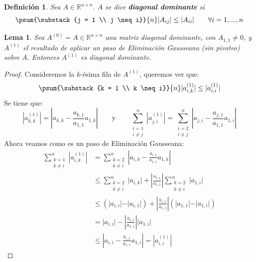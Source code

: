 \documentclass[12pt]{article}
\newtheorem{lema}{Lema}
\newtheorem{defi}{Definición}
\newcommand{\sub}[3]{\ensuremath{#1_{#2,#3}}}
\begin{document}
\begin{defi}
Sea \(A \in \mathbb{R}^{n \times n}\). \(A\) se dice \textbf{diagonal dominante} si 
\[
  \psum{\substack{j = 1 \\ j \neq i}}{n}|A_{ij}| \leq  |A_{ii}| \qquad \forall i = 1, ..., n
\]
\end{defi}

\begin{lema}
\label{lema:EG conserva diagonal dominante}
Sea \(A^{(0)} = A \in \mathbb{R}^{n \times n}\) una matriz diagonal dominante, con \(\sub{A}{1}{1} \neq 0\), y \(A^{(1)}\) el resultado de aplicar un paso de Eliminación Gausseana (sin pivoteo) sobre \(A\). Entonces \(A^{(1)}\) es diagonal dominante.
\end{lema}
\begin{proof}
Consideremos la \(k\)-ésima fila de \(A^{(1)}\), queremos ver que:
\[
  \psum{\substack{k = 1 \\ k \neq i}}{n} |a^{(1)}_{i,k}| \leq |a^{(1)}_{i,i} |
\]
Se tiene que:
\[
  | a^{(1)}_{k,k} | = | a_{k,k} - \frac{a_{k,1}}{a_{1,1}} a_{1,k} |
  \qquad \text{y} \qquad
  \sum_{\substack{i = 1 \\ i \neq j}}^n | a^{(1)}_{j,i} |
= \sum_{\substack{i = 2 \\ i \neq j}}^n | a_{j,i} - \frac{a_{j,1}}{a_{1,1}} a_{1,i} |
\]
Ahora veamos como es un paso de Eliminación Gausseana:
\[\begin{split}
  \sum_{\substack{k = 1 \\ k \neq i}}^n | a^{(1)}_{i,k} | & = \sum_{\substack{k = 2 \\ k \neq i}}^n | a_{i,k} - \frac{a_{i,1}}{a_{1,1}} a_{1,k} | \\
                                                          & \leq \sum_{\substack{k = 2 \\ k \neq i}}^n \vert a_{i,k} \vert + \left \vert \frac{a_{i,1}}{a_{1,1}} \right \vert \sum_{\substack{k = 2 \\ k \neq i}}^n \vert a_{1,i} \vert \\
                                                          & \leq \left( \vert a_{i,i} \vert - \vert a_{i,1} \vert \right) + \left \vert \frac{a_{i,1}}{a_{1,1}} \right \vert \left( \vert a_{1,1} \vert - \vert a_{1,i} \vert \right) \\
                                                          & = \vert a_{i,i} \vert - \left \vert \frac{a_{i,1}}{a_{1,1}} \right \vert \vert a_{1,i} \vert \\
                                                          & \leq \left \vert a_{i,i} -  \frac{a_{i,1}}{a_{1,1}} a_{1,i} \right \vert = | a^{(1)}_{i,i} | 
\end{split}\]
\end{proof}
\end{document}
